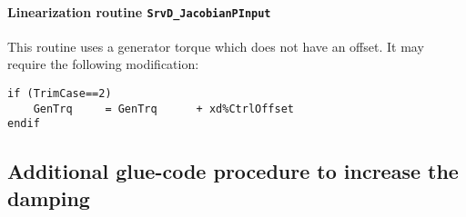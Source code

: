 \documentclass[11pt]{article}
\begin{document}
\paragraph{Linearization routine \tt{SrvD\_JacobianPInput}}
This routine uses a generator torque which does not have an offset. 
It may require the following modification:
\begin{lstlisting}
if (TrimCase==2)
    GenTrq     = GenTrq      + xd%CtrlOffset
endif
\end{lstlisting}


% 
% 
% 
% 
% 
% 






\subsection{Additional glue-code procedure to increase the damping}
\end{document}
